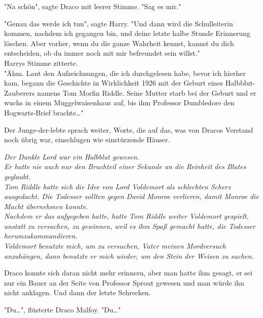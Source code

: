 {"Na schön", sagte Draco mit leerer Stimme. "Sag es mir."

"Genau das werde ich tun", sagte Harry. "Und dann wird die Schulleiterin kommen, nachdem ich gegangen bin, und deine letzte halbe Stunde Erinnerung löschen. Aber vorher, wenn du die ganze Wahrheit kennst, kannst du dich entscheiden, ob du immer noch mit mir befreundet sein willst."\\ Harrys Stimme zitterte.\\ "Ähm. Laut den Aufzeichnungen, die ich durchgelesen habe, bevor ich hierher kam, begann die Geschichte in Wirklichkeit 1926 mit der Geburt eines Halbblut-Zauberers namens Tom Morfin Riddle. Seine Mutter starb bei der Geburt und er wuchs in einem Muggelwaisenhaus auf, bis ihm Professor Dumbledore den Hogwarts-Brief brachte…"

Der Junge-der-lebte sprach weiter, Worte, die auf das, was von Dracos Verstand noch übrig war, einschlugen wie einstürzende Häuser.

\emph{Der Dunkle Lord war ein Halbblut gewesen.}\\ \emph{Er hatte nie auch nur den Bruchteil einer Sekunde an die Reinheit des Blutes geglaubt.}\\ \emph{Tom Riddle hatte sich die Idee von Lord Voldemort als schlechten Scherz ausgedacht. Die Todesser sollten gegen David Monroe verlieren, damit Monroe die Macht übernehmen konnte.}\\ \emph{Nachdem er das aufgegeben hatte, hatte Tom Riddle weiter Voldemort gespielt, anstatt zu versuchen, zu gewinnen, weil es ihm Spaß gemacht hatte, die Todesser herumzukommandieren.}\\ \emph{Voldemort benutzte mich, um zu versuchen, Vater meinen Mordversuch anzuhängen, dann benutzte er mich wieder, um den Stein der Weisen zu suchen.}

Draco konnte sich daran nicht mehr erinnern, aber man hatte ihm gesagt, er sei nur ein Bauer an der Seite von Professor Sprout gewesen und man würde ihn nicht anklagen. Und dann der letzte Schrecken.

"Du…", flüsterte Draco Malfoy. "Du…"

}
